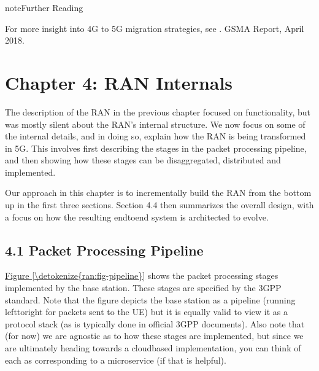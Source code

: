 \documentclass[a4paper,11pt,english]{sphinxmanual}
\begin{document}
\label{\detokenize{arch:reading-migration}}
\begin{sphinxadmonition}{note}{Further Reading}

\sphinxAtStartPar
For more insight into 4G to 5G migration strategies, see
.
GSMA Report, April 2018.
\end{sphinxadmonition}


\chapter{Chapter 4:  RAN Internals}
\label{\detokenize{ran:chapter-4-ran-internals}}\label{\detokenize{ran::doc}}
\sphinxAtStartPar
The description of the RAN in the previous chapter focused on
functionality, but was mostly silent about the RAN’s internal
structure. We now focus on some of the internal details, and in
doing so, explain how the RAN is being transformed in 5G. This
involves first describing the stages in the packet processing
pipeline, and then showing how these stages can be disaggregated,
distributed and implemented.

\sphinxAtStartPar
Our approach in this chapter is to incrementally build the RAN from
the bottom up in the first three sections. Section 4.4 then summarizes
the overall design, with a focus on how the resulting end\sphinxhyphen{}to\sphinxhyphen{}end
system is architected to evolve.


\section{4.1 Packet Processing Pipeline}
\label{\detokenize{ran:packet-processing-pipeline}}
\sphinxAtStartPar
\hyperref[\detokenize{ran:fig-pipeline}]{Figure \ref{\detokenize{ran:fig-pipeline}}} shows the packet processing stages
implemented by the base station. These stages are specified by the 3GPP
standard. Note that the figure depicts the base station as a pipeline
(running left\sphinxhyphen{}to\sphinxhyphen{}right for packets sent to the UE) but it is equally valid to view it as a protocol
stack (as is typically done in official 3GPP documents). Also note that
(for now) we are agnostic as to how these stages are implemented, but
since we are ultimately heading towards a cloud\sphinxhyphen{}based implementation,
you can think of each as corresponding to a microservice (if that is
helpful).
\end{document}
